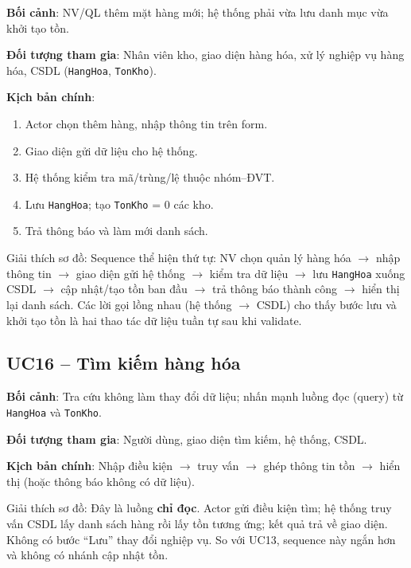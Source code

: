 \textbf{Bối cảnh}: NV/QL thêm mặt hàng mới; hệ thống phải vừa lưu danh mục vừa khởi tạo tồn.

\textbf{Đối tượng tham gia}: Nhân viên kho, giao diện hàng hóa, xử lý nghiệp vụ hàng hóa, CSDL (\texttt{HangHoa}, \texttt{TonKho}).

\textbf{Kịch bản chính}:
\begin{enumerate}[leftmargin=1.5cm]
    \item Actor chọn thêm hàng, nhập thông tin trên form.
    \item Giao diện gửi dữ liệu cho hệ thống.
    \item Hệ thống kiểm tra mã/trùng/lệ thuộc nhóm--ĐVT.
    \item Lưu \texttt{HangHoa}; tạo \texttt{TonKho} = 0 các kho.
    \item Trả thông báo và làm mới danh sách.
\end{enumerate}



Giải thích sơ đồ: Sequence thể hiện thứ tự: NV chọn quản lý hàng hóa $\rightarrow$ nhập thông tin $\rightarrow$ giao diện gửi hệ thống $\rightarrow$ kiểm tra dữ liệu $\rightarrow$ lưu \texttt{HangHoa} xuống CSDL $\rightarrow$ cập nhật/tạo tồn ban đầu $\rightarrow$ trả thông báo thành công $\rightarrow$ hiển thị lại danh sách. Các lời gọi lồng nhau (hệ thống $\rightarrow$ CSDL) cho thấy bước lưu và khởi tạo tồn là hai thao tác dữ liệu tuần tự sau khi validate.

\subsection{UC16 -- Tìm kiếm hàng hóa}

\textbf{Bối cảnh}: Tra cứu không làm thay đổi dữ liệu; nhấn mạnh luồng đọc (query) từ \texttt{HangHoa} và \texttt{TonKho}.

\textbf{Đối tượng tham gia}: Người dùng, giao diện tìm kiếm, hệ thống, CSDL.

\textbf{Kịch bản chính}: Nhập điều kiện $\rightarrow$ truy vấn $\rightarrow$ ghép thông tin tồn $\rightarrow$ hiển thị (hoặc thông báo không có dữ liệu).



Giải thích sơ đồ: Đây là luồng \textbf{chỉ đọc}. Actor gửi điều kiện tìm; hệ thống truy vấn CSDL lấy danh sách hàng rồi lấy tồn tương ứng; kết quả trả về giao diện. Không có bước ``Lưu'' thay đổi nghiệp vụ. So với UC13, sequence này ngắn hơn và không có nhánh cập nhật tồn.

